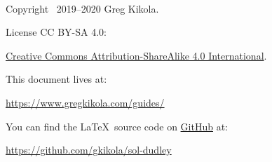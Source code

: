 \ \vspace{30mm}

\noindent Copyright \textcopyright\ 2019--2020 Greg Kikola.

\noindent License CC BY-SA 4.0:
\begin{center}
  \href{http://creativecommons.org/licenses/by-sa/4.0/}{Creative Commons
    Attribution-ShareAlike 4.0 International}.
\end{center}
\vspace{30mm}

\noindent This document lives at:
\begin{center}
  \href{https://www.gregkikola.com/guides/}
  {https://www.gregkikola.com/guides/}
\end{center}
You can find the \LaTeX\ source code on
\href{https://github.com/}{GitHub} at:
\begin{center}
  \href{https://github.com/gkikola/sol-dudley}
  {https://github.com/gkikola/sol-dudley}
\end{center}
